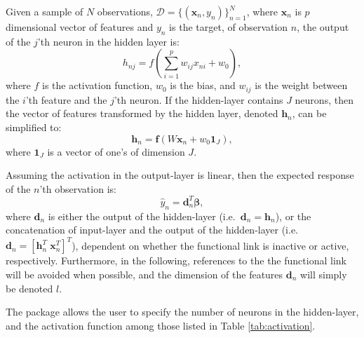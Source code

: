 \documentclass[
]{jss}
\begin{document}
Given a sample of \(N\) observations,
\(\mathcal D = \{(\boldsymbol x_n, y_n)\}_{n = 1}^N\), where
\(\boldsymbol x_n\) is \(p\) dimensional vector of features and \(y_n\)
is the target, of observation \(n\), the output of the \(j\)'th neuron
in the hidden layer is: \begin{equation}
    h_{nj} = f\left(\sum_{i = 1}^p w_{ij} x_{ni} + w_{0}\right), \label{eq:hidden}
\end{equation} where \(f\) is the activation function, \(w_0\) is the
bias, and \(w_{ij}\) is the weight between the \(i\)'th feature and the
\(j\)'th neuron. If the hidden-layer contains \(J\) neurons, then the
vector of features transformed by the hidden layer, denoted
\(\boldsymbol h_{n}\), can be simplified to: \begin{equation} 
    \boldsymbol h_n = \boldsymbol f\left(W \boldsymbol{x}_n + w_0 \boldsymbol{1}_{J}\right), 
\end{equation} where \(\boldsymbol{1}_{J}\) is a vector of one's of
dimension \(J\).

Assuming the activation in the output-layer is linear, then the expected
response of the \(n\)'th observation is: \begin{equation}
    \hat{y}_n = \boldsymbol d^T_n \boldsymbol \beta,
\end{equation} where \(\boldsymbol d_n\) is either the output of the
hidden-layer (i.e.~\(\boldsymbol d_n = \boldsymbol h_n\)), or the
concatenation of input-layer and the output of the hidden-layer
(i.e.~\(\boldsymbol d_n = [\boldsymbol h_n^T \; \boldsymbol x_n^T]^T\)),
dependent on whether the functional link is inactive or active,
respectively. Furthermore, in the following, references to the the
functional link will be avoided when possible, and the dimension of the
features \(\boldsymbol d_n\) will simply be denoted \(l\).

The  package allows the user to specify the number of neurons
in the hidden-layer, and the activation function among those listed in
Table \ref{tab:activation}.
\end{document}
